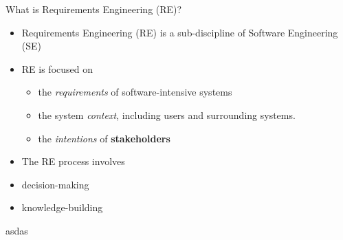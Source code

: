 \begin{Slide}{What is Requirements Engineering (RE)?}

\begin{itemize}
\item Requirements Engineering (RE) is a sub-discipline of Software Engineering (SE) 
\item RE is focused on 
\begin{itemize}
\item the \textit{requirements} of software-intensive systems 
\item the system \textit{context}, including users and surrounding systems.
\item the \textit{intentions} of \textbf{stakeholders}

\end{itemize}
\item The RE process involves 
\item decision-making
\item knowledge-building

\end{itemize}
asdas

\end{Slide}